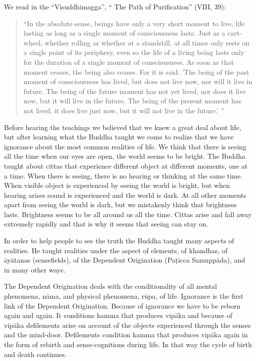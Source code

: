 \documentclass{book}
\begin{document}
We read in the ``Visuddhimagga'', `` The
Path of Purification'' (VIII, 39): 

\begin{quote}
``In the absolute sense,
beings have only a very short moment to live, life lasting as long as a
single moment of consciousness lasts. Just as a cart-wheel, whether
rolling or whether at a standstill, at all times only rests on a single
point of its periphery, even so the life of a living being lasts only
for the duration of a single moment of consciousness. As soon as that
moment ceases, the being also ceases. For it is said: 'The being of the
past moment of consciousness has lived, but does not live now, nor will
it live in future. The being of the future moment has not yet lived, nor
does it live now, but it will live in the future. The being of the
present moment has not lived, it does live just now, but it will not
live in the future.' ''
\end{quote}

Before hearing the teachings we believed
that we knew a great deal about life, but after learning what the Buddha
taught we come to realize that we have ignorance about the most common
realities of life. We think that there is seeing all the time when our
eyes are open, the world seems to be bright. The Buddha taught about
cittas that experience different object at different moments, one at a
time. When there is seeing, there is no hearing or thinking at the same
time. When visible object is experienced by seeing the world is bright,
but when hearing arises sound is experienced and the world is dark. At
all other moments apart from seeing the world is dark, but we mistakenly
think that brightness lasts. Brightness seems to be all around us all
the time. Cittas arise and fall away extremely rapidly and that is why
it seems that seeing can stay on. 

In order to help people to see the truth the
Buddha taught many aspects of realities. He taught realities under the
aspect of elements, of khandhas, of āyātanas (sensefields), of the
Dependent Origination (Paṭicca Samuppāda), and in many other ways. 

The Dependent Origination deals with the
conditionality of all mental phenomena, nāma, and physical phenomena,
rūpa, of life. Ignorance is the first link of the Dependent Origination.
Because of ignorance we have to be reborn again and again. It conditions
kamma that produces vipāka and because of vipāka defilements arise on
account of the objects experienced through the senses and the mind-door.
Defilements condition kamma that produces vipāka again in the form of
rebirth and sense-cognitions during life. In that way the cycle of birth
and death continues. 
\end{document}
